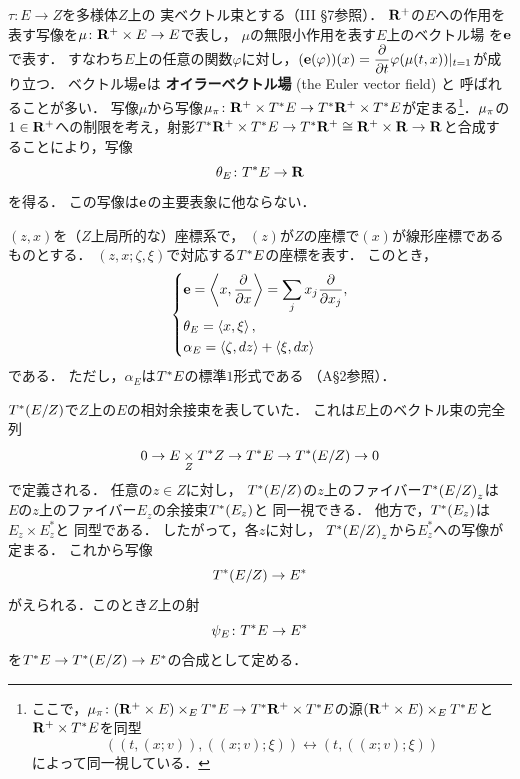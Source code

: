 \(\tau\colon E\to Z\)を多様体\(Z\)上の
実ベクトル束とする（III \S7参照）．
\(\rrp\)の\(E\)への作用を表す写像を\(
    \mu\colon \rrp\times E\to E
\)で表し，
\(\mu\)の無限小作用を表す\(E\)上のベクトル場
を\(\eu\)で表す．
すなわち\(E\)上の任意の関数\(\varphi\)に対し，\(
    (\eu(\varphi))(x)
    =
    \dfrac{\partial}{\partial{t}}\varphi(\mu(t,x))|_{t=1}
\)が成り立つ．
ベクトル場\(\eu\)は
\textbf{オイラーベクトル場} (the Euler vector field) と
呼ばれることが多い．
写像\(\mu\)から写像\(
    \mpb[\mu]\colon
    \rrp\times\cotb[E]\to\cotb[\rrp]\times\cotb[E]
\)が定まる\footnote{
    ここで，\(
        \mpb[\mu]\colon(\rrp\times E)\times_{E}\cotb[E]
        \to
        \cotb[\rrp]\times\cotb[E]
    \)の源\((\rrp\times E)\times_{E}\cotb[E]\)と\(
        \rrp\times\cotb[E]
    \)を同型\[
        \left(
            \left(t,\left(x;v\right)\right),
            \left(\left(x;v\right);\xi\right)
        \right)
        \leftrightarrow
        \left(
            t,
            \left(\left(x;v\right);\xi\right)
        \right)
    \]によって同一視している．
}．\(\mpb[\mu]\)の\(1\in\rrp\)への制限を考え，射影\(
    \cotb[\rrp]\times\cotb[E]
    \to
    \cotb[\rrp]\cong\rrp\times\rr\to\rr
\)と合成することにより，写像\begin{equation}
    \theta_{E}\colon\cotb[E]\to\rr
\end{equation}を得る．
この写像は\(\eu\)の主要表象に他ならない．

\((z,x)\)を（\(Z\)上局所的な）座標系で，
\((z)\)が\(Z\)の座標で\((x)\)が線形座標であるものとする．
\((z,x;\zeta,\xi)\)で対応する\(\cotb[E]\)の座標を表す．
このとき，
\begin{equation}
    \begin{dcases}
        \eu=\left\langle{x,\dfrac{\partial}{\partial{x}}}\right\rangle=\sum_{j}x_{j}\dfrac{\partial}{\partial{x_{j}}},\\
        \theta_{E}=\left\langle{x,\xi}\right\rangle,\\
        \alpha_{E}=\left\langle{\zeta,dz}\right\rangle+\left\langle{\xi,dx}\right\rangle
    \end{dcases}
\end{equation}
である．
ただし，\(\alpha_{E}\)は\(\cotb[E]\)の標準\(1\)形式である
（A\S2参照）．

\(\cotb[(E/Z)]\)で\(Z\)上の\(E\)の相対余接束を表していた．
これは\(E\)上のベクトル束の完全列
\begin{equation}
    0\to E\pb[Z]\cotb[Z]\to\cotb[E]\to\cotb[(E/Z)]\to0
\end{equation}
で定義される．
任意の\(z\in Z\)に対し，
\(\cotb[(E/Z)]\)の\(z\)上のファイバー\(\cotb[(E/Z)]_{z}\)は
\(E\)の\(z\)上のファイバー\(E_{z}\)の余接束\(\cotb[(E_{z})]\)と
同一視できる．
他方で，\(\cotb[(E_{z})]\)は\(E_{z}\times E^{\ast}_{z}\)と
同型である．
したがって，各\(z\)に対し，
\(\cotb[(E/Z)]_{z}\)から\(E^{\ast}_{z}\)への写像が定まる．
これから写像\begin{equation}
    \cotb[(E/Z)]\to E^{\ast}
\end{equation}がえられる．このとき\(Z\)上の射
\begin{equation}
    \psi_{E}\colon\cotb[E]\to E^{\ast}
\end{equation}
を\(\cotb[E]\to \cotb[(E/Z)]\to E^{\ast}\)の合成として定める．


